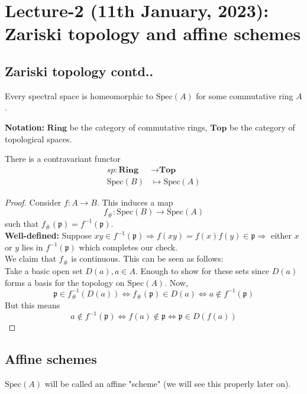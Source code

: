 \documentclass[oneside, 12pt, ]{scrbook}
\newcommand{\spec}{\mathrm{Spec}}
\newcommand{\pr}{\mathfrak{p}}
\theoremstyle{theorem}
\begin{document}
\chapter{Lecture-2 (11th January, 2023): Zariski topology and affine schemes}

\section{Zariski topology contd..}

\begin{theorem}[Hochster]
Every spectral space is homeomorphic to $\spec(A)$ for some commutative ring $A$.
\end{theorem}

\textbf{Notation:} $\mathrm{\textbf{Ring}}$ be the category of commutative rings, $\mathrm{\textbf{Top}}$ be the category of topological spaces.

\begin{theorem}
There is a contravariant functor 
\begin{align*}
sp: \mathrm{\textbf{Ring}} &\rightarrow \mathrm{\textbf{Top}} \\
\spec(B) &\mapsto \spec(A)
\end{align*}
\end{theorem}

\begin{proof}
Consider $f: A \rightarrow B$. This induces a map $$f_{\#} : \spec(B) \rightarrow \spec(A)$$ such that $f_{\#}(\pr) = f^{-1}(\pr)$. \\
\textbf{Well-defined:} Suppose $xy \in f^{-1}(\pr) \Rightarrow f(xy) = f(x)f(y) \in \pr \Rightarrow$ either $x$ or $y$ lies in $f^{-1}(\pr)$ which completes our check. \\
We claim that $f_{\#}$ is continuous. This can be seen as follows: \\
Take a basic open set $D(a), a\in A$. Enough to show for these sets since $D(a)$ forms a basis for the topology on $\spec(A)$. Now, $$\pr \in f_{\#}^{-1}(D(a))\Leftrightarrow f_{\#}(\pr) \in D(a) \Leftrightarrow a \not \in f^{-1}(\pr)$$ But this means $$a \not \in f^{-1}(\pr) \Leftrightarrow f(a) \not \in \pr \Leftrightarrow \pr \in D(f(a))$$
\end{proof}

\section{Affine schemes}

\begin{definition}
$\spec(A)$ will be called an affine "scheme" (we will see this properly later on).
\end{definition}
\end{document}

